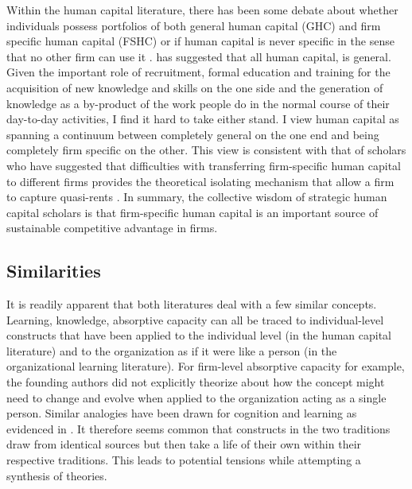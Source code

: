 \documentclass[12pt,letterpaper]{article}
\begin{document}
Within the human capital literature, there has been some debate about whether individuals possess portfolios of both general human capital (GHC) and firm specific human capital (FSHC) \citep{Campbell2012} or if human capital is never specific in the sense that no other firm can use it \citep{Lazear2009}. has suggested that all human capital, is general. Given the important role of recruitment, formal education and training for the acquisition of new knowledge and skills on the one side and the generation of knowledge as a by-product of the work people do in the normal course of their day-to-day activities, I find it hard to take either stand. I view human capital as spanning a continuum between completely general on the one end and being completely firm specific on the other. This view is consistent with that of scholars who have suggested that difficulties with transferring firm-specific human capital to different firms provides the theoretical isolating mechanism that allow a firm to capture quasi-rents \citep{Barney1991, Campbell2012}. In summary, the collective wisdom of strategic human capital scholars is that firm-specific human capital is an important source of sustainable competitive advantage in firms.

\subsection{Similarities}
It is readily apparent that both literatures deal with a few similar concepts. Learning, knowledge, absorptive capacity can all be traced to individual-level constructs that have been applied to the individual level (in the human capital literature) and to the organization as if it were like a person (in the organizational learning literature). For firm-level absorptive capacity \citep{Cohen1990} for example, the founding authors  did not explicitly theorize about how the concept might need to change and evolve when applied to the organization acting as a single person. Similar analogies have been drawn for cognition and learning as evidenced in  \cite{Gavetti2012b, Gavetti2005b}. It therefore seems common that constructs in the two traditions draw from identical sources but then take a life of their own within their respective traditions. This leads to potential tensions while attempting a synthesis of theories.
\end{document}
